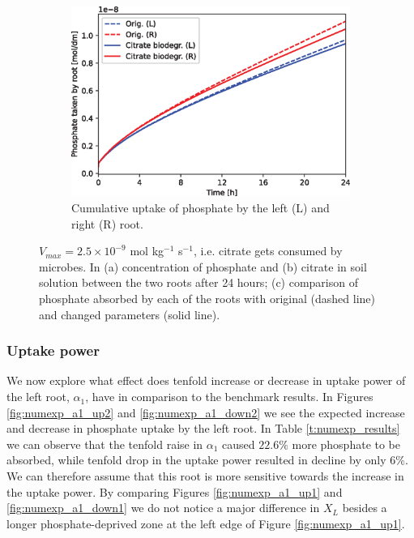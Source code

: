 \documentclass[11pt]{article}
\numberwithin{equation}{section}
\begin{document}
\begin{figure}[!htb]
\begin{subfigure}[t]{0.4\textwidth}
    \includegraphics[width=\textwidth]{Figures/citratevmaxnonzero.eps}
    \caption{Cumulative uptake of phosphate by the left (L) and right (R) root.}
    \label{fig:numexp_vmax2}
\end{subfigure}
\caption{$V_{max} = 2.5 \times 10^{-9}$ mol kg$^{-1}$ s$^{-1}$, i.e. citrate gets consumed by microbes. In (a) concentration of phosphate and (b) citrate in soil solution between the two roots after 24 hours; (c) comparison of phosphate absorbed by each of the roots with original (dashed line) and changed parameters (solid line).}
\end{figure}

\subsubsection{Uptake power}
\label{sec:numexp_a1}
We now explore what effect does tenfold increase or decrease in uptake power of the left root, $\alpha_1$, have in comparison to the benchmark results. In Figures \ref{fig:numexp_a1_up2} and \ref{fig:numexp_a1_down2} we see the expected increase and decrease in phosphate uptake by the left root. In Table \ref{t:numexp_results} we can observe that the tenfold raise in $\alpha_1$ caused $22.6 \%$ more phosphate to be absorbed, while tenfold drop in the uptake power resulted in decline by only $6 \%$. We can therefore assume that this root is more sensitive towards the increase in the uptake power. By comparing Figures \ref{fig:numexp_a1_up1} and \ref{fig:numexp_a1_down1} we do not notice a major difference in $X_L$ besides a longer phosphate-deprived zone at the left edge of Figure \ref{fig:numexp_a1_up1}.
\end{document}
